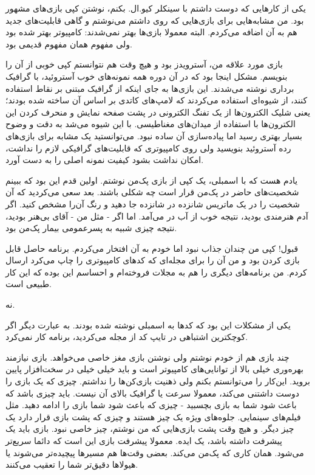 یکی از کارهایی که دوست داشتم با سینکلر کیو.ال. بکنم، نوشتن کپی بازی‌های
مشهور بود. من مشابه‌هایی برای بازی‌هایی که روی  داشتم می‌نوشتم و
گاهی قابلیت‌های جدید هم به آن اضافه می‌کردم. البته معمولا بازی‌ها بهتر
نمی‌شدند: کامپیوتر بهتر شده بود ولی مفهوم‌ همان مفهوم قدیمی بود.

بازی مورد علاقه من، آسترویدز بود و هیچ وقت هم
نتوانستم کپی خوبی از آن را بنویسم. مشکل اینجا بود که در آن دوره همه
نمونه‌های خوب آستروئید،‌ با گرافیک برداری نوشته می‌شدند. این بازی‌ها به
جای اینکه از گرافیک مبتنی بر نقاط استفاده کنند، از شیوه‌ای استفاده
می‌کردند که لامپ‌های کاتدی بر اساس آن ساخته شده بودند؛ یعنی شلیک
الکترون‌ها از یک تفنگ الکترونی در پشت صفحه نمایش و منحرف کردن این
الکترون‌ها با استفاده از میدان‌های مغناطیسی. با این شیوه می‌شد به دقت و
وضوح بسیار بهتری رسید اما پیاده‌سازی آن ساده نبود. می‌توانستید یک مشابه
برای بازی‌های رده آستروئید بنویسید ولی روی کامپیوتری که قابلیت‌های
گرافیکی لازم را نداشت، امکان نداشت بشود کیفیت نمونه اصلی را به دست
آورد.

یادم هست که با اسمبلی، یک کپی از بازی پک‌من نوشتم. اولین قدم این بود که ببینم
شخصیت‌های حاضر در پک‌من قرار است چه شکلی باشند. بعد سعی می‌کردید که آن
شخصیت را در یک ماتریس شانزده در شانزده جا دهید و رنگ آن‌را مشخص
کنید. اگر آدم هنرمندی بودید، نتیجه خوب از آب در می‌آمد. اما اگر - مثل
من - آقای بی‌هنر بودید، نتیجه چیزی شبیه به پسرعمومی بیمار پک‌من بود.

قبول! کپی من چندان جذاب نبود اما خودم به آن افتخار می‌کردم. برنامه حاصل
قابل بازی کردن بود و من آن را برای مجله‌ای که کدهای کامپیوتری را چاپ
می‌کرد ارسال کردم. من برنامه‌های دیگری را هم به مجلات فروخته‌ام و احساسم
این بوده که این کار طبیعی است.

نه. 

یکی از مشکلات این بود که کدها به اسمبلی نوشته شده بودند. به عبارت دیگر
اگر کوچکترین اشتباهی در تایپ کد از مجله می‌کردید، برنامه کار نمی‌کرد.

چند بازی هم از خودم نوشتم ولی نوشتن بازی مغز خاصی می‌خواهد. بازی
نیازمند بهره‌وری خیلی بالا از توانایی‌های کامپیوتر است و باید خیلی خیلی
در سخت‌افزار پایین بروید. این‌کار را می‌توانستم بکنم ولی ذهنیت بازی‌کن‌ها
را نداشتم. چیزی که یک بازی را دوست داشتنی می‌کند، معمولا سرعت یا گرافیک
بالای آن نیست. باید چیزی باشد که باعث شود شما به بازی بچسبید - چیزی که
باعث شود شما بازی را ادامه دهید. مثل فیلم‌های سینمایی. جلوه‌های ویژه یک
چیز هستند و چیزی که پشت بازی قرار دارد یک چیز دیگر. و هیچ وقت پشت
بازی‌هایی که من نوشتم، چیز خاصی نبود. بازی باید یک پیشرفت داشته باشد،
یک ایده. معمولا پیشرفت بازی این است که دائما سریع‌تر می‌شود. همان کاری
که پک‌من می‌کند. بعضی وقت‌ها هم مسیرها پیچیده‌تر می‌شوند یا هیولاها دقیق‌تر
شما را تعقیب می‌کنند.

